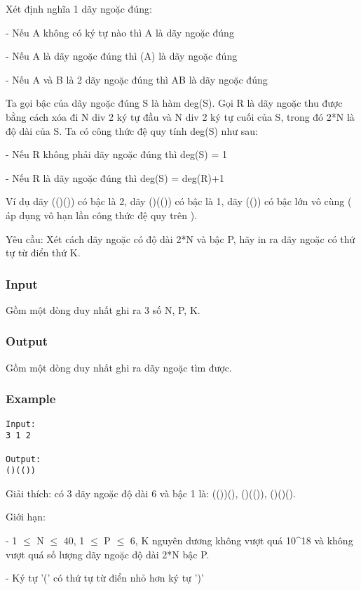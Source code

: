 



   Xét định nghĩa 1 dãy ngoặc đúng:   


   - Nếu A không có ký tự nào thì A là dãy ngoặc đúng   


   - Nếu A là dãy ngoặc đúng thì (A) là dãy ngoặc đúng   


   - Nếu A và B là 2 dãy ngoặc đúng thì AB là dãy ngoặc đúng   





   Ta gọi bậc của dãy ngoặc đúng S là hàm deg(S). Gọi R là dãy ngoặc thu được bằng cách xóa đi N div 2 ký tự đầu và N div 2 ký tự cuối của S, trong đó 2*N là độ dài của S. Ta có công thức đệ quy tính deg(S) như sau:   


   - Nếu R không phải dãy ngoặc đúng thì deg(S) = 1   


   - Nếu R là dãy ngoặc đúng thì deg(S) = deg(R)+1   





   Ví dụ dãy (()()) có bậc là 2, dãy ()(()) có bậc là 1, dãy (()) có bậc lớn vô cùng ( áp dụng vô hạn lần công thức đệ quy trên ).   


   Yêu cầu: Xét cách dãy ngoặc có độ dài 2*N và bậc P, hãy in ra dãy ngoặc có thứ tự từ điển thứ K.  

\subsubsection{   Input  }

   Gồm một dòng duy nhất ghi ra 3 số N, P, K.  

\subsubsection{   Output  }

   Gồm một dòng duy nhất ghi ra dãy ngoặc tìm được.  

\subsubsection{   Example  }
\begin{verbatim}
Input:
3 1 2

Output:
()(())
\end{verbatim}

   Giải thích: có 3 dãy ngoặc độ dài 6 và bậc 1 là: (())(), ()(()), ()()().   


   Giới hạn:   


   - 1  $\le$  N  $\le$  40, 1  $\le$  P  $\le$  6, K nguyên dương không vượt quá 10^18 và không vượt quá số lượng dãy ngoặc độ dài 2*N bậc P.   


   - Ký tự '(' có thứ tự từ điển nhỏ hơn ký tự ')'  
